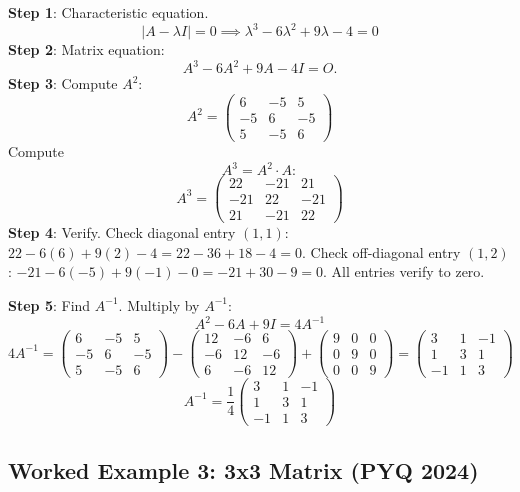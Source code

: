 \documentclass[
]{article}
\begin{document}
\textbf{Step 1}: Characteristic equation.
\[
|A - \lambda I| = 0 \implies \lambda^3 - 6\lambda^2 + 9\lambda - 4 = 0
\]
\textbf{Step 2}: Matrix equation:
\[
A^3 - 6A^2 + 9A - 4I = O.
\]
\textbf{Step 3}: Compute \(A^2\):
\[
A^2 =
\begin{pmatrix}
6 & -5 & 5 \\
-5 & 6 & -5 \\
5 & -5 & 6
\end{pmatrix}
\]
Compute
\[
A^3 = A^2 \cdot A:
\]
\[
A^3 =
\begin{pmatrix}
22 & -21 & 21 \\
-21 & 22 & -21 \\
21 & -21 & 22
\end{pmatrix}
\]
\textbf{Step 4}: Verify. Check diagonal entry \((1,1)\):
\(22 - 6(6) + 9(2) - 4 = 22 - 36 + 18 - 4 = 0\). Check off-diagonal
entry \((1,2)\): \(-21 - 6(-5) + 9(-1) - 0 = -21 + 30 - 9 = 0\). All
entries verify to zero.

\textbf{Step 5}: Find \(A^{-1}\). Multiply by \(A^{-1}\):
\[
A^2 - 6A + 9I = 4A^{-1}
\]
\[
4A^{-1} =
\begin{pmatrix}
6 & -5 & 5 \\
-5 & 6 & -5 \\
5 & -5 & 6
\end{pmatrix} - \begin{pmatrix} 12 & -6 & 6 \\ -6 & 12 & -6 \\ 6 & -6 & 12 \end{pmatrix} + \begin{pmatrix} 9 & 0 & 0 \\ 0 & 9 & 0 \\ 0 & 0 & 9 \end{pmatrix} = \begin{pmatrix} 3 & 1 & -1 \\ 1 & 3 & 1 \\ -1 & 1 & 3 \end{pmatrix}
\]
\[
A^{-1} = \frac{1}{4}
\begin{pmatrix}
3 & 1 & -1 \\
1 & 3 & 1 \\
-1 & 1 & 3
\end{pmatrix}
\]

\subsection{Worked Example 3: 3x3 Matrix (PYQ
2024)}\label{worked-example-3-3x3-matrix-pyq-2024}
\end{document}
